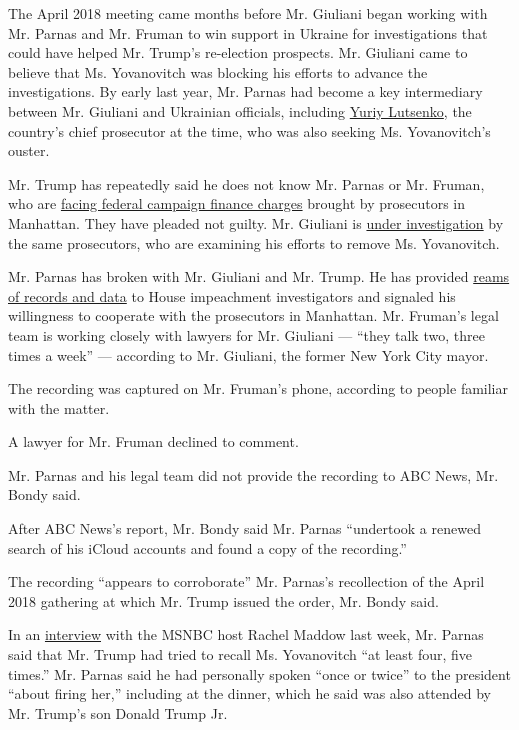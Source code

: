 The April 2018 meeting came months before Mr. Giuliani began working
with Mr. Parnas and Mr. Fruman to win support in Ukraine for
investigations that could have helped Mr. Trump's re-election prospects.
Mr. Giuliani came to believe that Ms. Yovanovitch was blocking his
efforts to advance the investigations. By early last year, Mr. Parnas
had become a key intermediary between Mr. Giuliani and Ukrainian
officials, including
\href{https://www.nytimes.com/2019/10/05/world/europe/ukraine-prosecutor-trump.html}{Yuriy
Lutsenko}, the country's chief prosecutor at the time, who was also
seeking Ms. Yovanovitch's ouster.

Mr. Trump has repeatedly said he does not know Mr. Parnas or Mr. Fruman,
who are
\href{https://www.nytimes.com/2019/10/10/us/politics/lev-parnas-igor-fruman-arrested-giuliani.html}{facing
federal campaign finance charges} brought by prosecutors in Manhattan.
They have pleaded not guilty. Mr. Giuliani is
\href{https://www.nytimes.com/2019/10/11/us/politics/rudy-giuliani-investigation.html}{under
investigation} by the same prosecutors, who are examining his efforts to
remove Ms. Yovanovitch.

Mr. Parnas has broken with Mr. Giuliani and Mr. Trump. He has provided
\href{https://www.nytimes.com/2020/01/17/us/politics/democrats-lev-parnas-material.html}{reams
of records and data} to House impeachment investigators and signaled his
willingness to cooperate with the prosecutors in Manhattan. Mr. Fruman's
legal team is working closely with lawyers for Mr. Giuliani --- ``they
talk two, three times a week'' --- according to Mr. Giuliani, the former
New York City mayor.

The recording was captured on Mr. Fruman's phone, according to people
familiar with the matter.

A lawyer for Mr. Fruman declined to comment.

Mr. Parnas and his legal team did not provide the recording to ABC News,
Mr. Bondy said.

After ABC News's report, Mr. Bondy said Mr. Parnas ``undertook a renewed
search of his iCloud accounts and found a copy of the recording.''

The recording ``appears to corroborate'' Mr. Parnas's recollection of
the April 2018 gathering at which Mr. Trump issued the order, Mr. Bondy
said.

In an
\href{http://www.msnbc.com/transcripts/rachel-maddow-show/2020-01-16}{interview}
with the MSNBC host Rachel Maddow last week, Mr. Parnas said that Mr.
Trump had tried to recall Ms. Yovanovitch ``at least four, five times.''
Mr. Parnas said he had personally spoken ``once or twice'' to the
president ``about firing her,'' including at the dinner, which he said
was also attended by Mr. Trump's son Donald Trump Jr.

